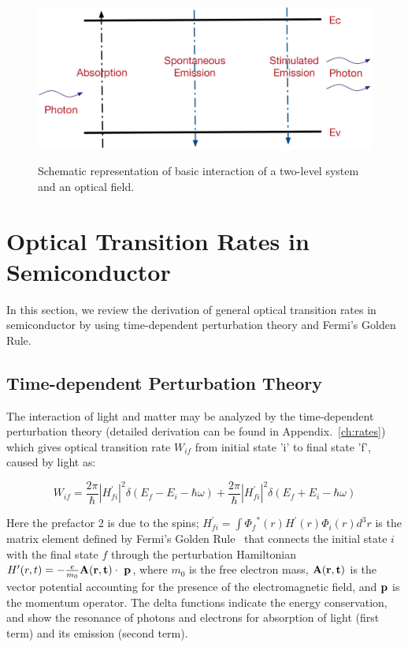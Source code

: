 \begin{figure}
  \caption{Schematic representation of basic interaction of a two-level system and an optical field.}
  \centering
  \includegraphics[width=\textwidth]{pictures/RM/OpticalProcess}
  \label{OpticalProcess}
\end{figure}

\section{Optical Transition Rates in Semiconductor} \label{OTR}

In this section, we review the derivation of general optical transition rates
in semiconductor by using time-dependent perturbation theory and Fermi's Golden
Rule.

\subsection{Time-dependent Perturbation Theory} \label{perturbation}

The interaction of light and matter may be analyzed by the time-dependent
perturbation theory (detailed derivation can be found in
Appendix.~\ref{ch:rates}) which gives optical transition rate $W_{if}$ from
initial state 'i' to final state 'f', caused by light as:

\begin{equation}
W_{if}=\frac{2\pi}{\hbar}|H_{fi}^\prime|^2\delta(E_f-E_i-\hbar\omega) + \frac{2\pi}{\hbar}|H_{fi}^\prime|^2\delta(E_f+E_i-\hbar\omega)
\label{eq:OTR}
\end{equation}

Here the prefactor 2 is due to the spins; $H_{fi}^\prime =
\int{{\Phi_f}^\ast(r)H^\prime(r)\Phi_i(r)}d^3r$ is the matrix element defined by
Fermi's Golden Rule~\cite{fermi1950nuclear} that connects the initial state $i$
with the final state $f$ through the perturbation Hamiltonian
${H^\prime}(r,t)=-{\frac{e}{m_0}}\bf{A}(r,t)\cdot~\bf{p}$, where $m_0$ is the
free electron mass, $\bf{A}(r,t)$ is the vector potential accounting for the
presence of the electromagnetic field, and $\bf{p}$ is the momentum operator.
The delta functions indicate the energy conservation, and show the resonance of
photons and electrons for absorption of light (first term) and its emission
(second term).

